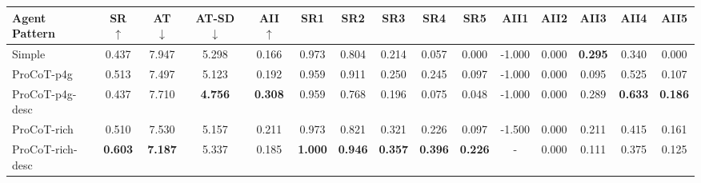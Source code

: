 \setlength{\tabcolsep}{3pt} %

\begin{table}[ht]
    \footnotesize
    \centering
    \begin{tabular}{lcccc|ccccc|ccccc}
        \toprule
                \bf{Agent Pattern} & \bf{SR} $\uparrow$ & \bf{AT} $\downarrow$ & \bf{AT-SD} $\downarrow$ & \bf{AII} $\uparrow$ & \bf{SR1} & \bf{SR2} & \bf{SR3} & \bf{SR4} & \bf{SR5} & \bf{AII1}  & \bf{AII2} & \bf{AII3}  & \bf{AII4} & \bf{AII5} \\
        \midrule
        Simple & 0.437 & 7.947 & 5.298 & 0.166 & 0.973 & 0.804 & 0.214 & 0.057 & 0.000 & -1.000 & 0.000 & \bf{0.295} & 0.340 & 0.000 \\
        ProCoT-p4g & 0.513 & 7.497 & 5.123 & 0.192 & 0.959 & 0.911 & 0.250 & 0.245 & 0.097 & -1.000 & 0.000 & 0.095 & 0.525 & 0.107 \\
        ProCoT-p4g-desc & 0.437 & 7.710 & \bf{4.756} & \bf{0.308} & 0.959 & 0.768 & 0.196 & 0.075 & 0.048 & -1.000 & 0.000 & 0.289 & \bf{0.633} & \bf{0.186} \\
        \cmidrule{1-15}
        ProCoT-rich & 0.510 & 7.530 & 5.157 & 0.211 & 0.973 & 0.821 & 0.321 & 0.226 & 0.097 & -1.500 & 0.000 & 0.211 & 0.415 & 0.161 \\
        ProCoT-rich-desc & \bf{0.603} & \bf{7.187} & 5.337 & 0.185 & \bf{1.000} & \bf{0.946} & \bf{0.357} & \bf{0.396} & \bf{0.226} & - & 0.000 & 0.111 & 0.375 & 0.125 \\

\end{tabular}
\end{table}
